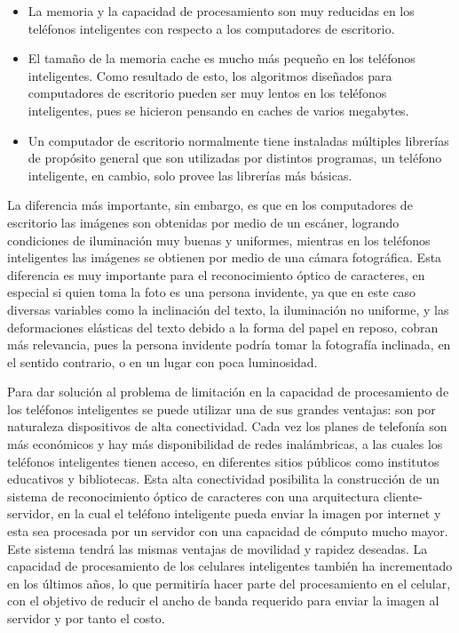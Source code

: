 \documentclass[a4paper, 11pt, oneside]{report}
\begin{document}
\begin{itemize}

\item La memoria y la capacidad de procesamiento son muy reducidas en los teléfonos inteligentes con respecto a los computadores de escritorio.

\item El tamaño de la memoria cache es mucho más pequeño en los teléfonos inteligentes. Como resultado de esto, los algoritmos diseñados para computadores de escritorio pueden ser muy lentos en los teléfonos inteligentes, pues se hicieron pensando en caches de varios megabytes.

\item Un computador de escritorio normalmente tiene instaladas múltiples librerías de propósito general que son utilizadas por distintos programas, un teléfono inteligente, en cambio, solo provee las librerías más básicas.

\end{itemize}

La diferencia más importante, sin embargo, es que en los computadores de escritorio las imágenes son obtenidas por medio de un escáner, logrando condiciones de iluminación muy buenas y uniformes, mientras en los teléfonos inteligentes las imágenes se obtienen por medio de una cámara fotográfica. Esta diferencia es muy importante para el reconocimiento óptico de caracteres, en especial si quien toma la foto es una persona invidente, ya que en este caso diversas variables como la inclinación del texto, la iluminación no uniforme, y las deformaciones elásticas del texto debido a la forma del papel en reposo, cobran más relevancia, pues la persona invidente podría tomar la fotografía inclinada, en el sentido contrario, o en un lugar con poca luminosidad.

Para dar solución al problema de limitación en la capacidad de procesamiento de los teléfonos inteligentes se puede utilizar una de sus grandes ventajas: son por naturaleza dispositivos de alta conectividad. Cada vez los planes de telefonía son más económicos y hay más disponibilidad de redes inalámbricas, a las cuales los teléfonos inteligentes tienen acceso, en diferentes sitios públicos como institutos educativos y bibliotecas. Esta alta conectividad posibilita la construcción de un sistema de reconocimiento óptico de caracteres con una arquitectura cliente-servidor, en la cual el teléfono inteligente pueda enviar la imagen por internet y esta sea procesada por un servidor con una capacidad de cómputo mucho mayor. Este sistema tendrá las mismas ventajas de movilidad y rapidez deseadas. La capacidad de procesamiento de los celulares inteligentes también ha incrementado en los últimos años, lo que permitiría hacer parte del procesamiento en el celular, con el objetivo de reducir el ancho de banda requerido para enviar la imagen al servidor y por tanto el costo.
\end{document}

